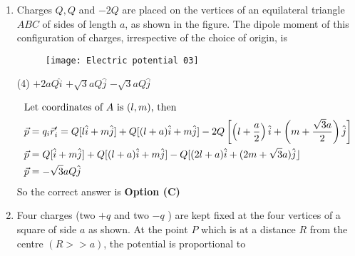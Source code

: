 \begin{enumerate}
	{}
	\begin{tasks}(4)
		\task[\textbf{A.}] $r e^{-K r}$
		\task[\textbf{B.}] $\frac{1}{r} e^{-K r}$
		\task[\textbf{C.}] $\frac{1}{r^{2}} e^{-K r}$
		\task[\textbf{D.}] $\frac{1}{r}\left(1-e^{-K r}\right)$
	\end{tasks}
	\begin{answer}
		\begin{align*}
		\text{	since }\nabla^{2} V&=-\rho / \varepsilon_{0}\\
		\nabla^{2} V\text{ must be proportional to }\frac{A}{r} e^{-k r},\text{ where }\nabla^{2} V&=\frac{1}{r^{2}} \frac{\partial}{\partial r}\left(r^{2} \frac{\partial V}{\partial r}\right).
		\end{align*}
		So the correct answer is \textbf{Option (B)}
	\end{answer}
	\item Charges $Q, Q$ and $-2 Q$ are placed on the vertices of an equilateral triangle $A B C$ of sides of length $a$, as shown in the figure. The dipole moment of this configuration of charges, irrespective of the choice of origin, is
	{}
	\begin{figure}[H]
		\centering
		\texttt{[image: Electric potential 03]}
		\caption{}
		\label{}
	\end{figure}
	\begin{tasks}(4)
		\task[\textbf{A.}] $+2 a Q \hat{i}$
		\task[\textbf{B.}] $+\sqrt{3} a Q \hat{j}$
		\task[\textbf{C.}] $-\sqrt{3} a Q \hat{j}$
	\end{tasks}
	\begin{answer}
		\begin{align*}
		\intertext{Let coordinates of $A$ is $(l, m)$, then}
		\vec{p}&=q_{i} \vec{r}_{i}^{\prime}=Q[l \hat{i}+m \hat{j}]+Q[(l+a) \hat{i}+m \hat{j}]-2 Q\left[\left(l+\frac{a}{2}\right) \hat{i}+\left(m+\frac{\sqrt{3} a}{2}\right) \hat{j}\right]\\
		\vec{p}&=Q[\hat{i}+m \hat{j}]+Q[(l+a) \hat{i}+m \hat{j}]-Q[(2 l+a) \hat{i}+(2 m+\sqrt{3} a) \hat{j}\rfloor \\ \vec{p}&=-\sqrt{3} a Q \hat{j}
		\end{align*}
		So the correct answer is \textbf{Option (C)}
	\end{answer}
	\item  Four charges (two $+q$ and two $-q$ ) are kept fixed at the four vertices of a square of side $a$ as shown. At the point $P$ which is at a distance $R$ from the centre $(R>>a)$, the potential is proportional to

\end{enumerate}
